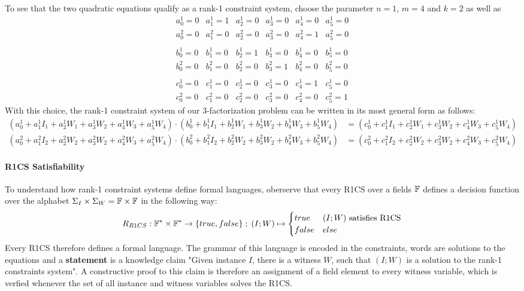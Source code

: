 \begin{example}[3-Factorization]
To see that the two quadratic equations qualify as a rank-1 constraint system, choose the parameter $n=1$, $m=4$ and $k=2$ as well as
$$
\begin{array}{llllll}
a_0^1 = 0 & a_1^1= 1 & a_2^1= 0 & a_3^1 = 0 & a_4^1= 0  & a_5^1= 0 \\ 
a_0^2 = 0 & a_1^2= 0 & a_2^2= 0 & a_3^2 = 0 & a_4^2= 1  & a_5^2= 0 \\ 
\\
b_0^1 = 0 & b_1^1= 0 & b_2^1= 1 & b_3^1 = 0 & b_4^1= 0  & b_5^1= 0 \\ 
b_0^2 = 0 & b_1^2= 0 & b_2^2= 0 & b_3^2 = 1 & b_4^2= 0  & b_5^2= 0 \\ 
\\
c_0^1 = 0 & c_1^1= 0 & c_2^1= 0 & c_3^1 = 0 & c_4^1= 1  & c_5^1= 0 \\ 
c_0^2 = 0 & c_1^2= 0 & c_2^2= 0 & c_3^2 = 0 & c_4^2= 0  & c_5^2= 1 
\end{array} 
$$
With this choice, the rank-1 constraint system of our $3$-factorization problem can be written in its most general form as follows:
\begin{align*}
\scriptstyle
\left(a^1_0 + a_1^1 I_1 + a_2^1 W_1 + a_3^1 W_2 + a_4^1 W_3 + a_5^1 W_4\right)\cdot
\left(b^1_0 + b_1^1 I_1 + b_2^1 W_1 + b_3^1 W_2 + b_4^1 W_3 + b_5^1 W_4\right) &=
\scriptstyle
\left(c^1_0 + c_1^1 I_1 + c_2^1 W_1 + c_3^1 W_2 + c_4^1 W_3 + c_5^1 W_4\right)\\
\scriptstyle
\left(a^2_0 + a_1^2 I_2 + a_2^2 W_2 + a_3^2 W_2 + a_4^2 W_3 + a_5^2 W_4\right)\cdot
\left(b^2_0 + b_1^2 I_2 + b_2^2 W_2 + b_3^2 W_2 + b_4^2 W_3 + b_5^2 W_4\right) &=
\scriptstyle
\left(c^2_0 + c_1^2 I_2 + c_2^2 W_2 + c_3^2 W_2 + c_4^2 W_3 + c_5^2 W_4\right)
\end{align*}
\end{example}
\paragraph{R1CS Satisfiability}To understand how rank-1 constraint systems define formal languages, oberserve that every R1CS over a fields $\mathbb{F}$ defines a decision function over the alphabet $\Sigma_I \times \Sigma_W = \mathbb{F} \times \mathbb{F}$ in the following way:
\begin{equation}
R_{R1CS} : \mathbb{F}^* \times \mathbb{F}^* \to \{true, false\}\;;\;
(I;W) \mapsto
\begin{cases}
true & (I;W) \text{ satisfies R1CS}\\
false & else
\end{cases}
\end{equation}
Every R1CS therefore defines a formal language. The grammar of this language is encoded in the constraints, words are solutions to the equations and  a \textbf{statement} is a knowledge claim "Given instance $I$, there is a witness $W$, such that $(I;W)$ is a solution to the rank-1 constraints system". A constructive proof to this claim is therefore an assignment of a field element to every witness variable, which is verfied whenever the set of all instance and witness variables solves the R1CS. 

